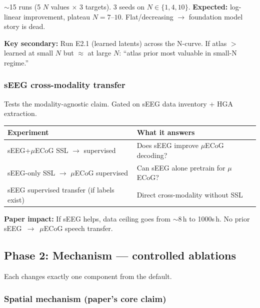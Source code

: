 \documentclass[11pt,letterpaper]{article}
\begin{document}
${\sim}$15 runs (5 $N$ values $\times$ 3 targets). 3 seeds on $N \in \{1, 4, 10\}$. \textbf{Expected:} log-linear improvement, plateau $N{=}7$--$10$. Flat/decreasing $\to$ foundation model story is dead.

\textbf{Key secondary:} Run E2.1 (learned latents) across the N-curve. If atlas $>$ learned at small $N$ but $\approx$ at large $N$: ``atlas prior most valuable in small-N regime.''

\subsubsection{sEEG cross-modality transfer}

Tests the modality-agnostic claim. \textcolor{BrickRed}{Gated on sEEG data inventory + HGA extraction.}

\begin{table}[ht!]\centering\small
\begin{tabular}{@{}lp{8cm}@{}}
\toprule
\textbf{Experiment} & \textbf{What it answers} \\
\midrule
sEEG+$\mu$ECoG SSL $\to$ supervised & Does sEEG improve $\mu$ECoG decoding? \\
sEEG-only SSL $\to$ $\mu$ECoG supervised & Can sEEG alone pretrain for $\mu$ECoG? \\
sEEG supervised transfer (if labels exist) & Direct cross-modality without SSL \\
\bottomrule
\end{tabular}
\end{table}

\textbf{Paper impact:} If sEEG helps, data ceiling goes from ${\sim}$8\,h to 1000s\,h. No prior sEEG~$\to$~$\mu$ECoG speech transfer.

\subsection{Phase 2: Mechanism --- controlled ablations}\label{sec:phase2}

Each changes exactly one component from the default.

\subsubsection{Spatial mechanism (paper's core claim)}
\end{document}
